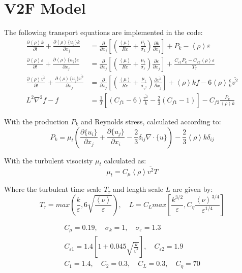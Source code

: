 \documentclass[paper=a4, fontsize=12pt]{scrartcl} %
\newcommand{\rave}[1]{\left<{#1}\right>}
\newcommand{\fave}[1]{\{{#1}\}}
\newcommand{\pd}{\partial }
\newcommand{\fpd}[2]{\frac{\partial #1}{\partial {#2}}}
\begin{document}
\section{V2F Model}
The following transport equations are implemented in the code:
\begin{equation} \label{eq:ktDeng}
\begin{split}
\fpd{\rave{\rho} k }{t} + \fpd{\rave{\rho}\fave{u_j}k}{x_j} &= \frac{\pd}{\pd x_j}\left[\left(\frac{\rave{\mu}}{Re} + \frac{\mu_t}{\sigma_k}\right)\fpd{k}{x_j}\right] + P_{k}- \rave{\rho}\varepsilon \\
\fpd{\rave{\rho} \varepsilon}{t} + \fpd{\rave{\rho} \fave{u_j} \varepsilon}{x_j} &= \frac{\pd}{\pd x_j}\left[ \left(\frac{\rave{\mu}}{Re} + \frac{\mu_t}{\sigma_{\varepsilon}}\right)\fpd {\varepsilon}{x_j}\right] + \frac{C_{\varepsilon1}P_k  -C_{\varepsilon2} \rave{\rho} \varepsilon}{T_\tau}   \\
\fpd{ \rave{\rho} \overline{v^2}}{t} + \fpd{ \rave{\rho} \fave{u_j} \overline{v^2}}{x_j}           &= \frac{\pd}{\pd x_j}\left[ \left(\frac{\rave{\mu}}{Re} + \frac{\mu_t}{\sigma_{\overline{v^2}}}\right)\fpd {\overline{v^2}}{x_j}\right] + \rave{\rho} k f - 6\rave{\rho} \frac{\varepsilon}{k}\overline{v^2} \\
L^2\nabla^2 f -f &= \frac{1}{T}\left[(C_{f1}-6)\frac{\overline{v^2}}{k}-\frac{2}{3}(C_{f1}-1)\right]-C_{f2}\frac{P_k}{\rave{\rho} k}
\end{split}
\end{equation}

With the production $P_k$ and Reynolds stress, calculated according to:
\begin{equation}
P_k = \mu_t \left(\fpd{\fave{u_i}}{x_j} +\fpd{\fave{u_j}}{x_i} - \frac{2}{3}\delta_{ij} \nabla \cdot \fave{u} \right) - \frac{2}{3} \rave{\rho} k \delta_{ij}
\end{equation}

With the turbulent visocisty $\mu_t$ calculated as:
\begin{equation}
\mu_t = C_\mu \rave{\rho} \overline{v^2} T
\end{equation}

Where the turbulent time scale $T_\tau$ and length scale $L$ are given by:
\begin{equation}
T_\tau = max\left(\frac{k}{\varepsilon},6\sqrt{\frac{\rave{\nu}}{\varepsilon}}\right), \quad L = C_L max\left[\frac{k^{3/2}}{\varepsilon},C_\eta\frac{\rave{\nu}^{3/4}}{\varepsilon^{1/4}}\right]
\end{equation}

\begin{equation}
\begin{split}
C_\mu = 0.19,\quad  \sigma_k = 1, \quad \sigma_\varepsilon =1.3 \\
C_{\varepsilon1} = 1.4\left[1+0.045\sqrt{\frac{k}{\overline{v}^2}}\right], \quad C_{\varepsilon2} = 1.9 \\
C_1 = 1.4, \quad C_2 = 0.3, \quad C_L=0.3, \quad C_\eta = 70
\end{split}
\end{equation}
\end{document}
